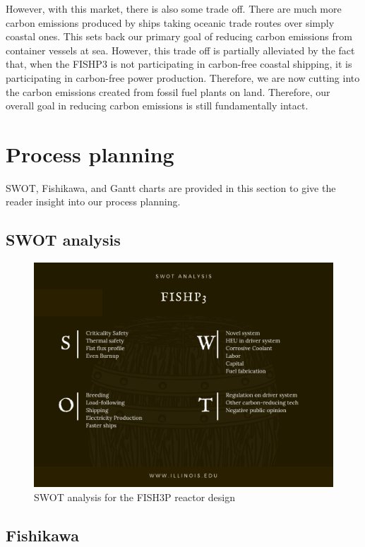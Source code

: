 \documentclass[12pt]{article}
\begin{document}
However, with this market, there is also some trade off. There are much more carbon emissions produced by ships taking oceanic trade routes over simply coastal ones. This sets back our primary goal of reducing carbon emissions from container vessels at sea. However, this trade off is partially alleviated by the fact that, when the FISHP3 is not participating in carbon-free coastal shipping, it is participating in carbon-free power production. Therefore, we are now cutting into the carbon emissions created from fossil fuel plants on land. Therefore, our overall goal in reducing carbon emissions is still fundamentally intact.


\section{Process planning}
SWOT, Fishikawa, and Gantt charts are provided in this section to give the reader insight into our process planning.
\subsection{SWOT analysis}
\begin{figure}[H]                                  
    \centering                                     
    \includegraphics[width=1\textwidth]{SWOT}   
   \caption{SWOT analysis for the FISH3P reactor design}                          
   \label{fig:mesh1}     
\end{figure}    
\subsection{Fishikawa}
\end{document}

